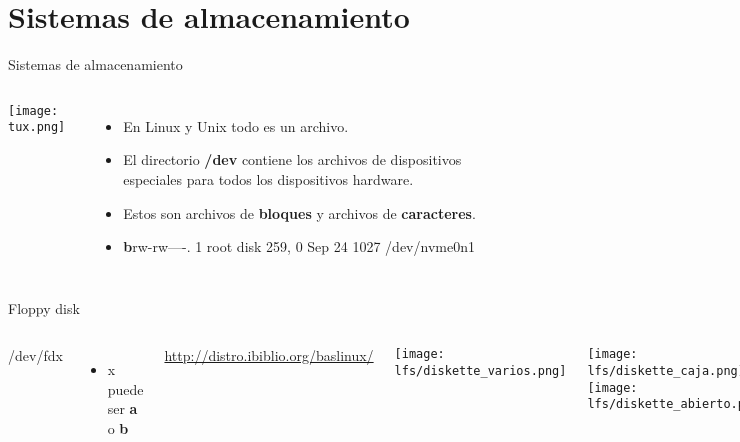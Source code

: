 %

\section{Sistemas de almacenamiento}

\begin{frame}[c]{Sistemas de almacenamiento}
  \begin{columns}
      \begin{center}
        \texttt{[image: tux.png]}
      \end{center}
      \begin{itemize}
        \item En Linux y Unix todo es un archivo.
        \pausa
        \item El directorio \textbf{/dev} contiene los archivos de dispositivos
          especiales para todos los dispositivos hardware.
        \pausa
        \item Estos son archivos de \textbf{bloques} y archivos de
          \textbf{caracteres}.
        \pausa
        \item \textbf{b}rw-rw----. 1 root disk 259, 0 Sep 24 1027
          /dev/nvme0n1
    \end{itemize}
  \end{columns}
\end{frame}

\begin{frame}[c]{Floppy disk}

  \begin{columns}
      {\huge /dev/fd{\color{red}x}}
      \begin{itemize}
        \item {\color{red}x} puede ser \textbf{a} o \textbf{b}
      \end{itemize}
      \href{http://distro.ibiblio.org/baslinux/}{http://distro.ibiblio.org/baslinux/}
      \begin{center}
        \texttt{[image: lfs/diskette\_varios.png]}
      \end{center}
      \begin{center}
        \texttt{[image: lfs/diskette\_caja.png]}
        \texttt{[image: lfs/diskette\_abierto.png]}
      \end{center}
  \end{columns}
\end{frame}

